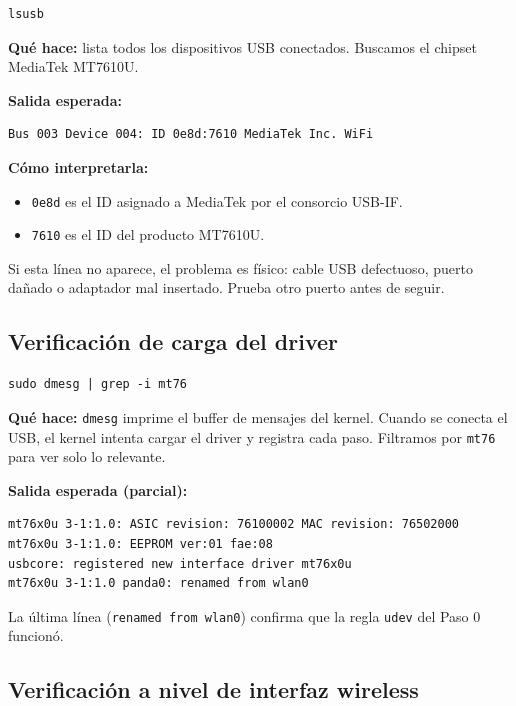 \documentclass[11pt,a4paper]{article}
\begin{document}
\begin{lstlisting}
lsusb
\end{lstlisting}

\textbf{Qué hace:} lista todos los dispositivos USB conectados. Buscamos
el chipset MediaTek MT7610U.

\textbf{Salida esperada:}

\begin{lstlisting}
Bus 003 Device 004: ID 0e8d:7610 MediaTek Inc. WiFi
\end{lstlisting}

\textbf{Cómo interpretarla:}

\begin{itemize}
  \item \texttt{0e8d} es el ID asignado a MediaTek por el consorcio USB-IF.
  \item \texttt{7610} es el ID del producto MT7610U.
\end{itemize}

Si esta línea no aparece, el problema es físico: cable USB defectuoso,
puerto dañado o adaptador mal insertado. Prueba otro puerto antes de
seguir.

\subsection{Verificación de carga del driver}

\begin{lstlisting}
sudo dmesg | grep -i mt76
\end{lstlisting}

\textbf{Qué hace:} \texttt{dmesg} imprime el buffer de mensajes del
kernel. Cuando se conecta el USB, el kernel intenta cargar el driver y
registra cada paso. Filtramos por \texttt{mt76} para ver solo lo relevante.

\textbf{Salida esperada (parcial):}

\begin{lstlisting}
mt76x0u 3-1:1.0: ASIC revision: 76100002 MAC revision: 76502000
mt76x0u 3-1:1.0: EEPROM ver:01 fae:08
usbcore: registered new interface driver mt76x0u
mt76x0u 3-1:1.0 panda0: renamed from wlan0
\end{lstlisting}

La última línea (\texttt{renamed from wlan0}) confirma que la regla
\texttt{udev} del Paso 0 funcionó.

\subsection{Verificación a nivel de interfaz wireless}
\end{document}
